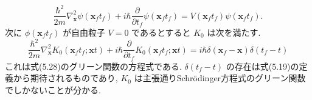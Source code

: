 \documentclass[a4paper,12pt]{article}
\begin{document}
\begin{equation*}
    \frac{\hbar^2}{2m}\nabla_{\mathbf{x}}^2 \psi(\mathbf{x}_f t_f) + i\hbar \frac{\partial}{\partial t_f} \psi(\mathbf{x}_f t_f) = V(\mathbf{x}_f t_f)\psi(\mathbf{x}_f t_f). \tag{5.28}
\end{equation*}
次に $\phi(\mathbf{x}_f t_f)$ が自由粒子 $V = 0$ であるとすると $K_0$ は次を満たす.
\begin{equation*}
    \frac{\hbar^2}{2m}\nabla_{\mathbf{x}}^2 K_0(\mathbf{x}_f t_f; \mathbf{x} t) + i\hbar \frac{\partial}{\partial t_f} K_0(\mathbf{x}_f t_f; \mathbf{x} t) = i\hbar \delta(\mathbf{x}_f - \mathbf{x})\delta(t_f - t) \tag{5.29}
\end{equation*}
これは式(5.28)のグリーン関数の方程式である. $\delta(t_f - t)$ の存在は式(5.19)の定義から期待されるものであり, $K_0$ は主張通りSchr\"{o}dinger方程式のグリーン関数でしかないことが分かる.
\color{blue}
\end{document}
